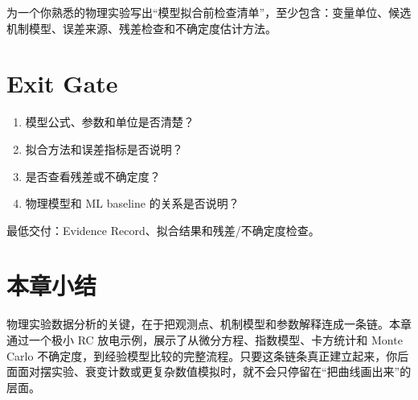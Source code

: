 \begin{exercisebox}[开放练习]
为一个你熟悉的物理实验写出“模型拟合前检查清单”，至少包含：变量单位、候选机制模型、误差来源、残差检查和不确定度估计方法。
\end{exercisebox}

\section{Exit Gate}

\begin{enumerate}
    \item 模型公式、参数和单位是否清楚？
    \item 拟合方法和误差指标是否说明？
    \item 是否查看残差或不确定度？
    \item 物理模型和 ML baseline 的关系是否说明？
\end{enumerate}

最低交付：Evidence Record、拟合结果和残差/不确定度检查。

\section{本章小结}

物理实验数据分析的关键，在于把观测点、机制模型和参数解释连成一条链。本章通过一个极小 RC 放电示例，展示了从微分方程、指数模型、卡方统计和 Monte Carlo 不确定度，到经验模型比较的完整流程。只要这条链条真正建立起来，你后面面对摆实验、衰变计数或更复杂数值模拟时，就不会只停留在“把曲线画出来”的层面。
